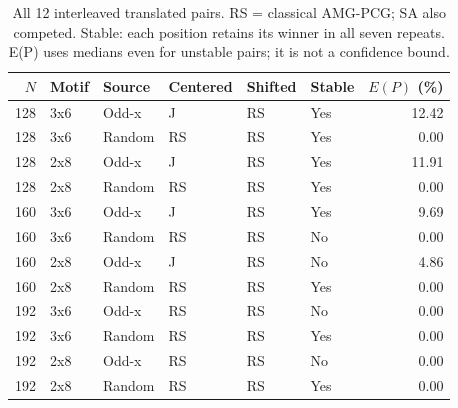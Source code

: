\documentclass[10pt]{article}
\begin{document}
\begin{table}[t]
\centering
\caption{All 12 interleaved translated pairs. RS = classical AMG-PCG; SA also competed. Stable: each position retains its winner in all seven repeats. E(P) uses medians even for unstable pairs; it is not a confidence bound.}
\label{tab:portfolio-audit}
\begin{tabular}{rlllllr}
\toprule
$N$ & Motif & Source & Centered & Shifted & Stable & $E(P)$ (\%) \\
\midrule
128 & 3x6 & Odd-x & J & RS & Yes & 12.42 \\
128 & 3x6 & Random & RS & RS & Yes & 0.00 \\
128 & 2x8 & Odd-x & J & RS & Yes & 11.91 \\
128 & 2x8 & Random & RS & RS & Yes & 0.00 \\
160 & 3x6 & Odd-x & J & RS & Yes & 9.69 \\
160 & 3x6 & Random & RS & RS & No & 0.00 \\
160 & 2x8 & Odd-x & J & RS & No & 4.86 \\
160 & 2x8 & Random & RS & RS & Yes & 0.00 \\
192 & 3x6 & Odd-x & RS & RS & No & 0.00 \\
192 & 3x6 & Random & RS & RS & Yes & 0.00 \\
192 & 2x8 & Odd-x & RS & RS & No & 0.00 \\
192 & 2x8 & Random & RS & RS & Yes & 0.00 \\
\bottomrule
\end{tabular}
\end{table}
\end{document}
